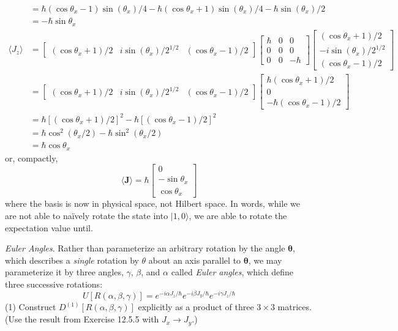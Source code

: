 \documentclass[../principles-of-quantum-mechanics.tex]{subfiles}
\begin{document}
\begin{questions}
\begin{solution}
\begin{align*}
				&= \hbar(\cos\theta_x - 1)\sin(\theta_x)/4 - \hbar(\cos\theta_x + 1)\sin(\theta_x)/4 - \hbar\sin(\theta_x)/2 \\
				&= -\hbar\sin\theta_x \\
				\langle J_z\rangle &= \begin{bmatrix}(\cos\theta_x + 1)/2 & i\sin(\theta_x)/2^{1/2} & (\cos\theta_x - 1)/2\end{bmatrix}\begin{bmatrix}\hbar & 0 & 0 \\ 0 & 0 & 0 \\ 0 & 0 & -\hbar\end{bmatrix}\begin{bmatrix}(\cos\theta_x + 1)/2 \\ -i\sin(\theta_x)/2^{1/2} \\ (\cos\theta_x - 1)/2\end{bmatrix} \\
				&= \begin{bmatrix}(\cos\theta_x + 1)/2 & i\sin(\theta_x)/2^{1/2} & (\cos\theta_x - 1)/2\end{bmatrix}\begin{bmatrix}\hbar(\cos\theta_x + 1)/2 \\ 0 \\ -\hbar(\cos\theta_x - 1)/2 \end{bmatrix} \\
				&= \hbar[(\cos\theta_x + 1)/2]^2 - \hbar[(\cos\theta_x - 1)/2]^2 \\
				&= \hbar\cos^2(\theta_x/2) - \hbar\sin^2(\theta_x/2) \\
				&= \hbar\cos\theta_x
			\end{align*}
			or, compactly,
			$$\langle \mathbf{J}\rangle = \hbar\begin{bmatrix}0 \\ -\sin\theta_x \\ \cos\theta_x\end{bmatrix}$$
			where the basis is now in physical space, not Hilbert space. In words, while we are not able to na\"ively rotate the state into $|1, 0\rangle$, we are able to rotate the expectation value until.
		\end{solution}
		
		\question \textit{Euler Angles}. Rather than parameterize an arbitrary rotation by the angle $\boldsymbol{\theta}$, which describes a \textit{single} rotation by $\theta$ about an axis parallel to $\boldsymbol{\theta}$, we may parameterize it by three angles, $\gamma$, $\beta$, and $\alpha$ called \textit{Euler angles}, which define three successive rotations:
		$$U[R(\alpha, \beta, \gamma)] = e^{-i\alpha J_z/\hbar}e^{-i\beta J_y/\hbar}e^{-i\gamma J_z/\hbar}$$
		(1) Construct $D^{(1)}[R(\alpha, \beta, \gamma)]$ explicitly as a product of three $3\times3$ matrices. (Use the result from Exercise 12.5.5 with $J_x\to J_y$.)
		

\end{questions}
\end{document}
